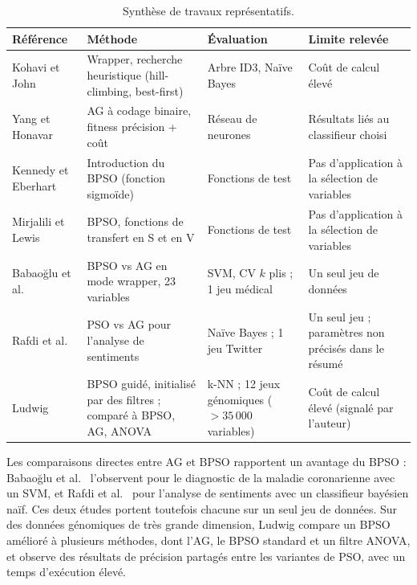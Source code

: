 \documentclass[11pt,a4paper]{report}
\begin{document}
\begin{table}[H]
\centering
\caption{Synthèse de travaux représentatifs.}
\label{tab:etat-art}
\small
\begin{tabular}{@{}>{\raggedright}p{3cm}>{\raggedright}p{4.3cm}>{\raggedright}p{2.7cm}p{4.2cm}@{}}
\toprule
Référence & Méthode & Évaluation & Limite relevée \\
\midrule
Kohavi et John \cite{kohavi1997} & Wrapper, recherche heuristique (hill-climbing, best-first)
  & Arbre ID3, Naïve Bayes & Coût de calcul élevé \\
Yang et Honavar \cite{yang1998} & AG à codage binaire, fitness précision + coût
  & Réseau de neurones & Résultats liés au classifieur choisi \\
Kennedy et Eberhart \cite{kennedy1997} & Introduction du BPSO (fonction sigmoïde)
  & Fonctions de test & Pas d'application à la sélection de variables \\
Mirjalili et Lewis \cite{mirjalili2013} & BPSO, fonctions de transfert en S et en V
  & Fonctions de test & Pas d'application à la sélection de variables \\
\midrule
Babaoğlu et al.\ \cite{babaoglu2010} & BPSO vs AG en mode wrapper, 23 variables
  & SVM, CV $k$ plis ; 1 jeu médical & Un seul jeu de données \\
Rafdi et al.\ \cite{rafdi2021} & PSO vs AG pour l'analyse de sentiments
  & Naïve Bayes ; 1 jeu Twitter & Un seul jeu ; paramètres non précisés dans le résumé \\
Ludwig \cite{ludwig2025} & BPSO guidé, initialisé par des filtres ; comparé à BPSO, AG, ANOVA
  & k-NN ; 12 jeux génomiques ($> 35\,000$ variables) & Coût de calcul élevé (signalé par l'auteur) \\
\bottomrule
\end{tabular}
\end{table}

\noindent Les comparaisons directes entre AG et BPSO rapportent un avantage du BPSO : Babaoğlu
et al.\ \cite{babaoglu2010} l'observent pour le diagnostic de la maladie coronarienne avec un
SVM, et Rafdi et al.\ \cite{rafdi2021} pour l'analyse de sentiments avec un classifieur bayésien
naïf. Ces deux études portent toutefois chacune sur un seul jeu de données. Sur des données
génomiques de très grande dimension, Ludwig \cite{ludwig2025} compare un BPSO amélioré à
plusieurs méthodes, dont l'AG, le BPSO standard et un filtre ANOVA, et observe des résultats de
précision partagés entre les variantes de PSO, avec un temps d'exécution élevé.
\end{document}
